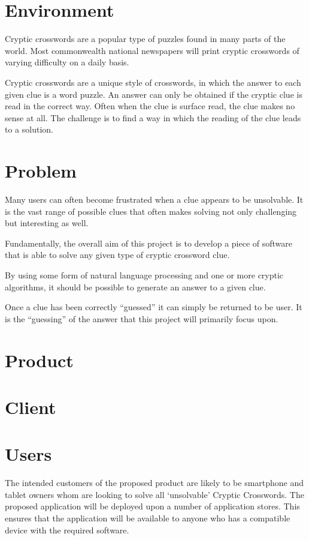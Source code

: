 \section{Environment}

Cryptic crosswords are a popular type of puzzles found in many parts of the 
world. Most commonwealth national newspapers will print cryptic crosswords of 
varying difficulty on a daily basis.

Cryptic crosswords are a unique style of crosswords, in which the answer to 
each given clue is a word puzzle. An answer can only be obtained if the cryptic
clue is read in the correct way. Often when the clue is surface read, the clue 
makes no sense at all. The challenge is to find a way in which the reading of 
the clue leads to a solution.


\section{Problem}

Many users can often become frustrated when a clue appears to be unsolvable. It
is the vast range of possible clues that often makes solving not only 
challenging but interesting as well.

Fundamentally, the overall aim of this project is to develop a piece of 
software that is able to solve any given type of cryptic crossword clue.

By using some form of natural language processing and one or more cryptic 
algorithms, it should be possible to generate an answer to a given clue.

Once a clue has been correctly ``guessed'' it can simply be returned to be 
user. It is the ``guessing'' of the answer that this project will primarily 
focus upon.

\section{Product}


\section{Client}


\section{Users} 

The intended customers of the proposed product are likely to be smartphone and
tablet owners whom are looking to solve all `unsolvable' Cryptic Crosswords. The
proposed  application will be deployed upon a number of application stores. This
ensures that the application will be available to anyone who has a compatible 
device with the required software.

